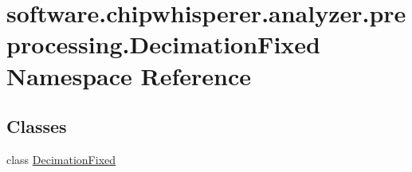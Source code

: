 \hypertarget{namespacesoftware_1_1chipwhisperer_1_1analyzer_1_1preprocessing_1_1DecimationFixed}{}\section{software.\+chipwhisperer.\+analyzer.\+preprocessing.\+Decimation\+Fixed Namespace Reference}
\label{namespacesoftware_1_1chipwhisperer_1_1analyzer_1_1preprocessing_1_1DecimationFixed}
\subsection*{Classes}
\begin{DoxyCompactItemize}
\item 
class \hyperlink{classsoftware_1_1chipwhisperer_1_1analyzer_1_1preprocessing_1_1DecimationFixed_1_1DecimationFixed}{Decimation\+Fixed}
\end{DoxyCompactItemize}
